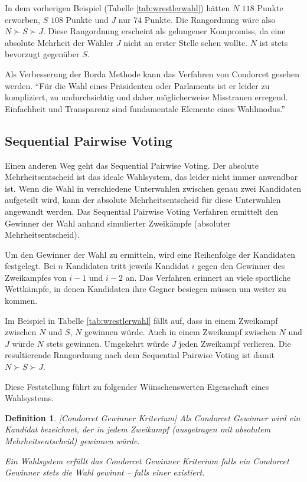 \documentclass[BCOR5mm,DIV12,a4paper,10pt]{scrartcl}
\newtheorem{definition}[lemma]{Definition} %
\begin{document}
In dem vorherigen Beispiel (Tabelle \ref{tab:wrestlerwahl}) hätten $N$ $118$ Punkte erworben, $S$ $108$ Punkte und $J$ nur $74$ Punkte. Die Rangordnung wäre also $ N \succ S \succ J $. Diese Rangordnung erscheint als gelungener Kompromiss, da eine absolute Mehrheit der Wähler $J$ nicht an erster Stelle sehen wollte. $N$ ist stets bevorzugt gegenüber $S$.

Als Verbesserung der Borda Methode kann das Verfahren von Condorcet gesehen werden. ``Für die Wahl eines Präsidenten oder Parlaments ist er leider zu kompliziert, zu undurchsichtig und daher möglicherweise Misstrauen erregend. Einfachheit und Transparenz sind fundamentale Elemente eines Wahlmodus.'' \cite{spektrum}

\subsection{Sequential Pairwise Voting}
Einen anderen Weg geht das Sequential Pairwise Voting. Der absolute Mehrheitsentscheid ist das ideale Wahlsystem, das leider nicht immer anwendbar ist. Wenn die Wahl in verschiedene Unterwahlen zwischen genau zwei Kandidaten aufgeteilt wird, kann der absolute Mehrheitsentscheid für diese Unterwahlen angewandt werden. Das Sequential Pairwise Voting Verfahren ermittelt den Gewinner der Wahl anhand simulierter Zweikämpfe (absoluter Mehrheitsentscheid).

Um den Gewinner der Wahl zu ermitteln, wird eine Reihenfolge der Kandidaten festgelegt. Bei $n$ Kandidaten tritt jeweils Kandidat $i$ gegen den Gewinner des Zweikampfes von $i-1$ und $i-2$ an. Das Verfahren erinnert an viele sportliche Wettkämpfe, in denen Kandidaten ihre Gegner besiegen müssen um weiter zu kommen.

Im Beispiel in Tabelle \ref{tab:wrestlerwahl} fällt auf, dass in einem Zweikampf zwischen $N$ und $S$, $N$ gewinnen würde. Auch in einem Zweikampf zwischen $N$ und $J$ würde $N$ stets gewinnen. Umgekehrt würde $J$ jeden Zweikampf verlieren. Die resultierende Rangordnung nach dem Sequential Pairwise Voting ist damit $ N \succ S \succ J $.

Diese Feststellung führt zu folgender Wünschenswerten Eigenschaft eines Wahlsystems.

\begin{definition}\emph{[Condorcet Gewinner Kriterium]}
Als Condorcet Gewinner wird ein Kandidat bezeichnet, der in jedem Zweikampf (ausgetragen mit absolutem Mehrheitsentscheid) gewinnen würde.

Ein Wahlsystem erfüllt das Condorcet Gewinner Kriterium falls ein Condorcet Gewinner stets die Wahl gewinnt -- falls einer existiert.
\end{definition}
\end{document}
